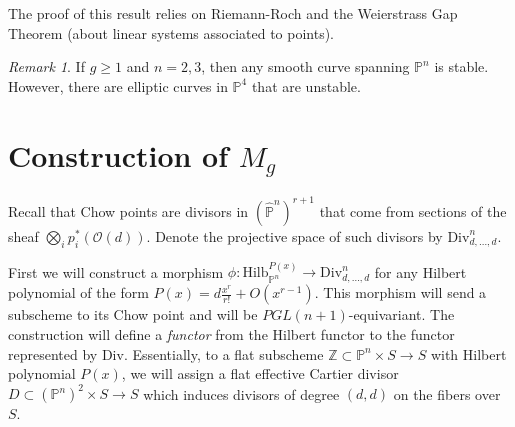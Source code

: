 \documentclass[leqno, openany]{memoir}
\theoremstyle{definition}
\theoremstyle{remark}
\newtheorem{rmk}[thm]{Remark}
\theoremstyle{plain}
\theoremstyle{definition}
\theoremstyle{remark}
\newcommand{\Z}{\mathbb{Z}}
\renewcommand{\P}{\mathbb{P}}
\newcommand{\mc}[1]{\mathcal{#1}}
\newcommand{\mr}[1]{\mathrm{#1}}
\newcommand{\wh}[1]{\widehat{#1}}
\begin{document}
The proof of this result relies on Riemann-Roch and the Weierstrass Gap Theorem
(about linear systems associated to points).

\begin{rmk} If $g \geq 1$ and $n = 2,3$, then any smooth curve spanning $\P^n$
is stable. However, there are elliptic curves in $\P^4$ that are unstable.
\end{rmk}

\section{Construction of $M_g$}%

Recall that Chow points are divisors in $(\wh{\P}^n)^{r+1}$ that come from
sections of the sheaf $\bigotimes_i p_i^*(\mc{O}(d))$. Denote the projective
space of such divisors by $\mr{Div}_{d, \ldots, d}^n$. 

First we will construct a morphism $\phi \colon \mr{Hilb}_{\P^n}^{P(x)} \to
\mr{Div}^n_{d, \ldots, d}$ for any Hilbert polynomial of the form $P(x) = d
\frac{x^r}{r!} + O(x^{r-1})$. This morphism will send a subscheme to its Chow
point and will be $PGL(n+1)$-equivariant. The construction will define a
\textit{functor} from the Hilbert functor to the functor represented by
$\mr{Div}$. Essentially, to a flat subscheme $\Z \subset \P^n \times S \to S$
with Hilbert polynomial $P(x)$, we will assign a flat effective Cartier divisor
$D \subset (\P^n)^2 \times S \to S$ which induces divisors of degree $(d,d)$ on
the fibers over $S$.
\end{document}
